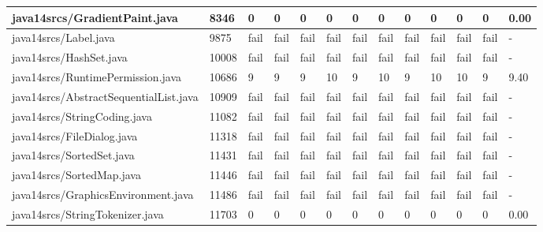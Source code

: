 \begin{tabular}{|l|l|l|l|l|l|l|l|l|l|l|l|l|}
\hline
java14srcs/GradientPaint.java                      & 8346        & 0         & 0         & 0         & 0         & 0         & 0         & 0         & 0         & 0         & 0         & 0.00      \\
\hline
java14srcs/Label.java                              & 9875        & fail      & fail      & fail      & fail      & fail      & fail      & fail      & fail      & fail      & fail      & -         \\
\hline
java14srcs/HashSet.java                            & 10008       & fail      & fail      & fail      & fail      & fail      & fail      & fail      & fail      & fail      & fail      & -         \\
\hline
java14srcs/RuntimePermission.java                  & 10686       & 9         & 9         & 9         & 10        & 9         & 10        & 9         & 10        & 10        & 9         & 9.40      \\
\hline
java14srcs/AbstractSequentialList.java             & 10909       & fail      & fail      & fail      & fail      & fail      & fail      & fail      & fail      & fail      & fail      & -         \\
\hline
java14srcs/StringCoding.java                       & 11082       & fail      & fail      & fail      & fail      & fail      & fail      & fail      & fail      & fail      & fail      & -         \\
\hline
java14srcs/FileDialog.java                         & 11318       & fail      & fail      & fail      & fail      & fail      & fail      & fail      & fail      & fail      & fail      & -         \\
\hline
java14srcs/SortedSet.java                          & 11431       & fail      & fail      & fail      & fail      & fail      & fail      & fail      & fail      & fail      & fail      & -         \\
\hline
java14srcs/SortedMap.java                          & 11446       & fail      & fail      & fail      & fail      & fail      & fail      & fail      & fail      & fail      & fail      & -         \\
\hline
java14srcs/GraphicsEnvironment.java                & 11486       & fail      & fail      & fail      & fail      & fail      & fail      & fail      & fail      & fail      & fail      & -         \\
\hline
java14srcs/StringTokenizer.java                    & 11703       & 0         & 0         & 0         & 0         & 0         & 0         & 0         & 0         & 0         & 0         & 0.00      \\

\end{tabular}
